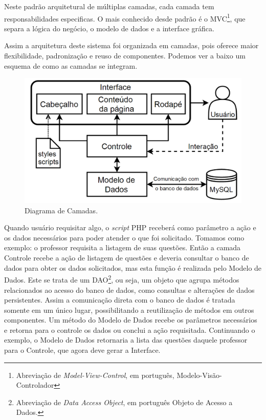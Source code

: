\documentclass[
	12pt,				%
	openany,
	oneside,
	a4paper,			%
	english,			%
	brazil				%
	]{abntex2}
\begin{document}
  Neste padrão arquitetural de múltiplas camadas, cada camada tem responsabilidades especificas. O mais conhecido desde padrão é o MVC\footnote{Abreviação de \textit{Model-View-Control}, em português, Modelo-Visão-Controlador}, que separa a lógica do negócio, o modelo de dados e a interface gráfica.

  Assim a arquitetura deste sistema foi organizada em camadas, pois oferece maior flexibilidade, padronização e reuso de componentes. Podemos ver a baixo um esquema de como as camadas se integram.

\begin{figure}[H]
  \centering
  \includegraphics[scale=0.4]{camadas.png}
  \caption{Diagrama de Camadas.}
  \label{fig:dCamadas}
\end{figure}

  Quando usuário requisitar algo, o \textit{script} PHP receberá como parâmetro a ação e os dados necessários para poder atender o que foi solicitado. Tomamos como exemplo: o professor requisita a listagem de suas questões. Então a camada Controle recebe a ação de listagem de questões e deveria consultar o banco de dados para obter os dados solicitados, mas esta função é realizada pelo Modelo de Dados. Este se trata de um DAO\footnote{Abreviação de \textit{Data Access Object}, em português Objeto de Acesso a Dados.}, ou seja, um objeto que agrupa métodos relacionados ao acesso do banco de dados, como consultas e alterações de dados persistentes. Assim a comunicação direta com o banco de dados é tratada somente em um único lugar, possibilitando a reutilização de métodos em outros componentes. Um método do Modelo de Dados recebe os parâmetros necessários e retorna para o controle os dados ou conclui a ação requisitada. Continuando o exemplo, o Modelo de Dados retornaria a lista das questões daquele professor para o Controle, que agora deve gerar a Interface.
\end{document}

